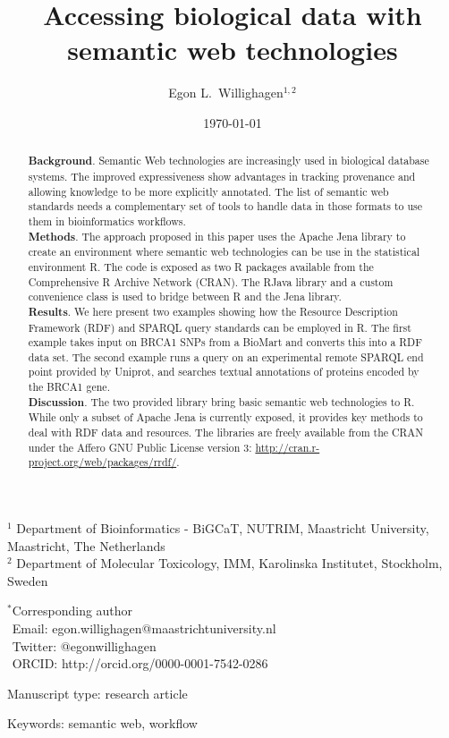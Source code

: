 \documentclass[12pt]{article}
\title{Accessing biological data with semantic web technologies}
\author{Egon L.\ Willighagen$^{1,2}$}
\begin{document}
\date{\today}
\maketitle

\noindent
$^1$ Department of Bioinformatics - BiGCaT, NUTRIM, Maastricht University, Maastricht, The Netherlands \\
$^2$ Department of Molecular Toxicology, IMM, Karolinska Institutet, Stockholm, Sweden

\bigskip
\noindent
$^*$Corresponding author\\
$\phantom{^*}$Email: egon.willighagen@maastrichtuniversity.nl\\
$\phantom{^*}$Twitter: @egonwillighagen\\
$\phantom{^*}$ORCID: http://orcid.org/0000-0001-7542-0286

\bigskip
\noindent
Manuscript type: research article

\bigskip
\noindent Keywords: semantic web, workflow

\newpage
\begin{abstract}
\noindent
\textbf{Background}. Semantic Web technologies are increasingly used in biological database systems.
The improved expressiveness show advantages in tracking provenance and allowing knowledge to be
more explicitly annotated. The list of semantic web standards needs a complementary set of tools to
handle data in those formats to use them in bioinformatics workflows. \\
\textbf{Methods}. The approach proposed in this paper uses the Apache Jena library to create an
environment where semantic web technologies can be use in the statistical environment R. The
code is exposed as two R packages available from the Comprehensive R Archive Network (CRAN). 
The RJava library and a custom convenience class is used to bridge between R and the Jena library.\\
\textbf{Results}. We here present two examples showing how the Resource Description Framework
(RDF) and SPARQL query standards can be employed in R. The first example takes input on BRCA1 SNPs
from a BioMart and converts this into a RDF data set. The second example runs a query on an
experimental remote SPARQL end point provided by Uniprot, and searches textual annotations of
proteins encoded by the BRCA1 gene. \\
\textbf{Discussion}. The two provided library bring basic semantic web technologies to R.
While only a subset of Apache Jena is currently exposed, it provides key methods to deal with
RDF data and resources. The libraries are freely available from the CRAN under the 
Affero GNU Public License version 3: \url{http://cran.r-project.org/web/packages/rrdf/}.
\end{abstract}
\end{document}

